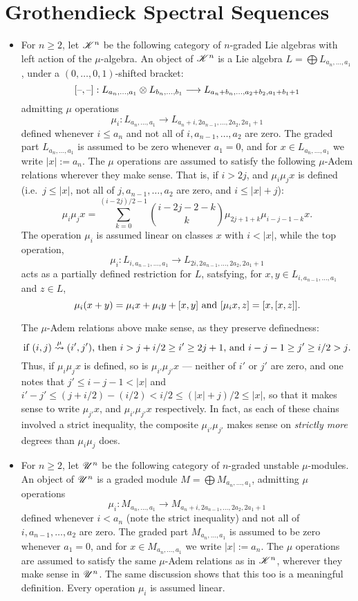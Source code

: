 \documentclass[11pt]{article}
\newcommand{\LL}[1]{{\scrK}^{#1}}%
\newcommand{\nontop}[1]{\scrU^{#1}}%
\newcommand{\produces}[1]{\overset{#1}{\rightsquigarrow}}
\begin{document}
\section*{Grothendieck Spectral Sequences}
\begin{itemize}
\setlength{\parindent}{.25in}
\item For $n\geq2$, let $\LL{n}$ be the following category of $n$-graded Lie algebras with left action of the $\mu$-algebra. An object of $\LL{n}$ is a Lie algebra $L=\bigoplus L_{a_n,\ldots,a_1}$, under a $(0,\ldots,0,1)$-shifted bracket:
\[[\textup{--},\textup{--}]:L_{a_n,\ldots,a_1}\otimes L_{b_n,\ldots,b_1}\longrightarrow L_{a_n+b_n,\ldots,a_2+b_2,a_1+b_1+1}\]
admitting $\mu$ operations
\[\mu_i:L_{a_n,\ldots,a_1}\to L_{a_n+i,2a_{n-1},\ldots,2a_2,2a_1+1}\]
defined whenever $i\leq a_n$ and not all of $i,a_{n-1},\ldots,a_{2}$ are zero.
The graded part $L_{a_n,\ldots,a_1}$ is assumed to be zero whenever $a_1=0$, and for $x\in L_{a_n,\ldots,a_1}$ we write $|x|:=a_n$. The $\mu$ operations are assumed to satisfy the following $\mu$-Adem relations wherever they make sense. That is, if $i>2j$, and $\mu_i\mu_jx$ is defined (i.e.\ $j\leq|x|$, not all of $j,a_{n-1},\ldots,a_2$ are zero, and $i\leq|x|+j$):
\[\mu_i\mu_jx=\sum_{k=0}^{(i-2j)/2-1}{i-2j-2-k\choose k}\mu_{2j+1+k}\mu_{i-j-1-k}x.\]
The operation $\mu_i$ is assumed linear on classes $x$ with $i<|x|$, while the top operation, 
\[\mu_i:L_{i, a_{n-1},\ldots,a_1}\to L_{2i, 2a_{n-1},\ldots,2a_2,2a_1+1}\]
acts as a partially defined restriction for $L$, satsfying, for $x,y\in L_{i, a_{n-1},\ldots,a_1}$ and $z\in L$,
\[\mu_i(x+y)=\mu_ix+\mu_iy+[x,y]\textup{ and }[\mu_{i}x,z]=[x,[x,z]].\]

\begin{shaded}\noindent
The $\mu$-Adem relations above make sense, as they preserve definedness:
\[\textup{if $(i,j)\produces{\mu}(i',j')$, then $i>j+i/2\geq i'\geq2j+1$, and $i-j-1\geq j'\geq i/2>j$.}\]
Thus, if $\mu_i\mu_jx$ is defined, so is $\mu_{i'}\mu_{j'}x$ --- neither of $i'$ or $j'$ are zero, and one notes that $j'\leq i-j-1<|x|$ and $i'-j'\leq (j+i/2)-(i/2)<i/2\leq(|x|+j)/2\leq |x|$, so that it makes sense to write $\mu_{j'}x$, and $\mu_{i'}\mu_{j'}x$ respectively. In fact, as each of these chains involved a strict inequality, the composite $\mu_{i'}\mu_{j'}$ makes sense on \emph{strictly more} degrees than $\mu_{i}\mu_{j}$ does.
\end{shaded}

\item For $n\geq2$, let $\nontop{n}$ be the following category of $n$-graded unstable $\mu$-modules. An object of $\nontop{n}$ is a graded module $M=\bigoplus M_{a_n,\ldots,a_1}$,
admitting $\mu$ operations
\[\mu_i:M_{a_n,\ldots,a_1}\to M_{a_n+i,2a_{n-1},\ldots,2a_2,2a_1+1}\]
defined whenever $i< a_n$ (note the strict inequality) and not all of $i,a_{n-1},\ldots,a_{2}$ are zero.
The graded part $M_{a_n,\ldots,a_1}$ is assumed to be zero whenever $a_1=0$, and for $x\in M_{a_n,\ldots,a_1}$ we write $|x|:=a_n$. The $\mu$ operations are assumed to satisfy the same $\mu$-Adem relations as in $\LL{n}$, wherever they make sense in $\nontop{n}$. The same discussion shows that this too is a meaningful definition. Every operation $\mu_i$ is assumed linear.


\end{itemize}
\end{document}
